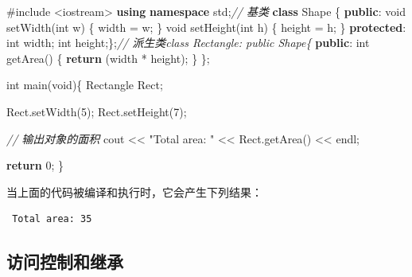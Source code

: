 \documentclass[
]{article}
\newenvironment{Shaded}{}{}
\newcommand{\CommentTok}[1]{\textcolor[rgb]{0.38,0.63,0.69}{\textit{#1}}}
\newcommand{\ControlFlowTok}[1]{\textcolor[rgb]{0.00,0.44,0.13}{\textbf{#1}}}
\newcommand{\DataTypeTok}[1]{\textcolor[rgb]{0.56,0.13,0.00}{#1}}
\newcommand{\DecValTok}[1]{\textcolor[rgb]{0.25,0.63,0.44}{#1}}
\newcommand{\ImportTok}[1]{#1}
\newcommand{\KeywordTok}[1]{\textcolor[rgb]{0.00,0.44,0.13}{\textbf{#1}}}
\newcommand{\NormalTok}[1]{#1}
\newcommand{\OperatorTok}[1]{\textcolor[rgb]{0.40,0.40,0.40}{#1}}
\newcommand{\PreprocessorTok}[1]{\textcolor[rgb]{0.74,0.48,0.00}{#1}}
\newcommand{\StringTok}[1]{\textcolor[rgb]{0.25,0.44,0.63}{#1}}
\begin{document}
\begin{Shaded}
\begin{Highlighting}[]
\PreprocessorTok{\#include }\ImportTok{\textless{}iostream\textgreater{}}
\KeywordTok{using} \KeywordTok{namespace}\NormalTok{ std}\OperatorTok{;}\CommentTok{// 基类}
\KeywordTok{class}\NormalTok{ Shape }\OperatorTok{\{}
   \KeywordTok{public}\OperatorTok{:}
      \DataTypeTok{void}\NormalTok{ setWidth}\OperatorTok{(}\DataTypeTok{int}\NormalTok{ w}\OperatorTok{)}
      \OperatorTok{\{}
\NormalTok{         width }\OperatorTok{=}\NormalTok{ w}\OperatorTok{;}
      \OperatorTok{\}}
      \DataTypeTok{void}\NormalTok{ setHeight}\OperatorTok{(}\DataTypeTok{int}\NormalTok{ h}\OperatorTok{)}
      \OperatorTok{\{}
\NormalTok{         height }\OperatorTok{=}\NormalTok{ h}\OperatorTok{;}
      \OperatorTok{\}}
   \KeywordTok{protected}\OperatorTok{:}
      \DataTypeTok{int}\NormalTok{ width}\OperatorTok{;}
      \DataTypeTok{int}\NormalTok{ height}\OperatorTok{;\};}\CommentTok{// 派生类class Rectangle: public Shape\{}
   \KeywordTok{public}\OperatorTok{:}
      \DataTypeTok{int}\NormalTok{ getArea}\OperatorTok{()}
      \OperatorTok{\{} 
         \ControlFlowTok{return} \OperatorTok{(}\NormalTok{width }\OperatorTok{*}\NormalTok{ height}\OperatorTok{);} 
      \OperatorTok{\}}
\OperatorTok{\};}
      
\DataTypeTok{int}\NormalTok{ main}\OperatorTok{(}\DataTypeTok{void}\OperatorTok{)\{}
\NormalTok{   Rectangle Rect}\OperatorTok{;}

\NormalTok{   Rect}\OperatorTok{.}\NormalTok{setWidth}\OperatorTok{(}\DecValTok{5}\OperatorTok{);}
\NormalTok{   Rect}\OperatorTok{.}\NormalTok{setHeight}\OperatorTok{(}\DecValTok{7}\OperatorTok{);}

   \CommentTok{// 输出对象的面积}
\NormalTok{   cout }\OperatorTok{\textless{}\textless{}} \StringTok{"Total area: "} \OperatorTok{\textless{}\textless{}}\NormalTok{ Rect}\OperatorTok{.}\NormalTok{getArea}\OperatorTok{()} \OperatorTok{\textless{}\textless{}}\NormalTok{ endl}\OperatorTok{;}

   \ControlFlowTok{return} \DecValTok{0}\OperatorTok{;}
\OperatorTok{\}}
\end{Highlighting}
\end{Shaded}

当上面的代码被编译和执行时，它会产生下列结果：

\begin{verbatim}
 Total area: 35
\end{verbatim}

\hypertarget{ux8bbfux95eeux63a7ux5236ux548cux7ee7ux627f}{%
\subsection{访问控制和继承}\label{ux8bbfux95eeux63a7ux5236ux548cux7ee7ux627f}}
\end{document}
